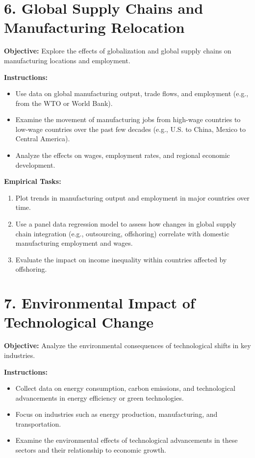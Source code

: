 \documentclass{article}
\begin{document}
\section*{6. Global Supply Chains and Manufacturing Relocation}
\textbf{Objective:} Explore the effects of globalization and global supply chains on manufacturing locations and employment.

\textbf{Instructions:}
\begin{itemize}
    \item Use data on global manufacturing output, trade flows, and employment (e.g., from the WTO or World Bank).
    \item Examine the movement of manufacturing jobs from high-wage countries to low-wage countries over the past few decades (e.g., U.S. to China, Mexico to Central America).
    \item Analyze the effects on wages, employment rates, and regional economic development.
\end{itemize}

\textbf{Empirical Tasks:}
\begin{enumerate}
    \item Plot trends in manufacturing output and employment in major countries over time.
    \item Use a panel data regression model to assess how changes in global supply chain integration (e.g., outsourcing, offshoring) correlate with domestic manufacturing employment and wages.
    \item Evaluate the impact on income inequality within countries affected by offshoring.
\end{enumerate}

\section*{7. Environmental Impact of Technological Change}
\textbf{Objective:} Analyze the environmental consequences of technological shifts in key industries.

\textbf{Instructions:}
\begin{itemize}
    \item Collect data on energy consumption, carbon emissions, and technological advancements in energy efficiency or green technologies.
    \item Focus on industries such as energy production, manufacturing, and transportation.
    \item Examine the environmental effects of technological advancements in these sectors and their relationship to economic growth.
\end{itemize}
\end{document}
